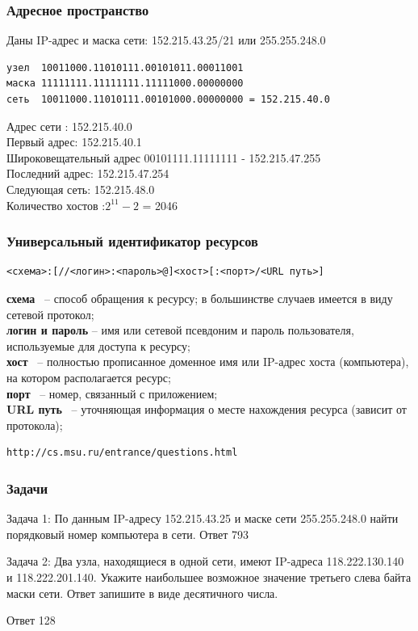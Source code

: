 \begin{frame}[fragile]
\frametitle{Адресное пространство}
Даны IP-адрес и маска сети: 152.215.43.25/21 или 255.255.248.0
\begin{verbatim}
узел  10011000.11010111.00101011.00011001
маска 11111111.11111111.11111000.00000000
сеть  10011000.11010111.00101000.00000000 = 152.215.40.0
\end{verbatim}
Адрес сети : 152.215.40.0 \\
Первый адрес: 152.215.40.1 \\
Широковещательный адрес 
	 00101111.11111111  - 152.215.47.255\\
Последний адрес: 152.215.47.254 \\
Следующая сеть: 152.215.48.0 \\
Количество хостов :$2^{11}-2$ = 2046 \\

\end{frame}

\begin{frame}[fragile]
\frametitle{Универсальный идентификатор ресурсов}
\begin{verbatim}
<схема>:[//<логин>:<пароль>@]<хост>[:<порт>/<URL путь>] 
\end{verbatim}

\textbf{схема}  – способ обращения к ресурсу; в большинстве случаев имеется в виду сетевой протокол;\\
\textbf{логин и пароль} – имя или сетевой псевдоним и пароль пользователя, используемые для доступа к ресурсу;\\
\textbf{хост}  – полностью прописанное доменное имя или IP-адрес хоста (компьютера), на котором располагается ресурс;\\
\textbf{порт}  – номер, связанный с приложением;\\
\textbf{URL путь}  – уточняющая информация о месте нахождения ресурса (зависит от протокола);

\begin{verbatim}
http://cs.msu.ru/entrance/questions.html
\end{verbatim}


\end{frame}

\begin{frame}[fragile]
\frametitle{Задачи}
Задача 1: По данным IP-адресу 152.215.43.25 и маске сети 255.255.248.0 найти порядковый номер компьютера в сети.
\pause Ответ 793

Задача 2:  Два узла, находящиеся в одной сети, имеют IP-адреса 118.222.130.140 и 118.222.201.140. Укажите наибольшее возможное значение третьего слева байта маски сети. Ответ запишите в виде десятичного числа.

\pause Ответ 128
\end{frame}


